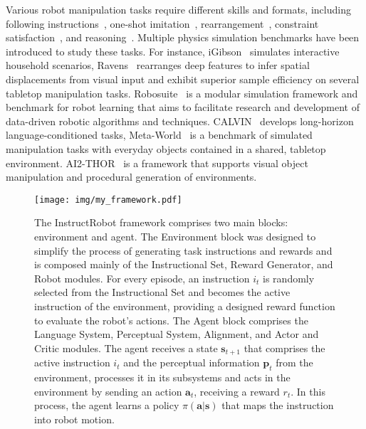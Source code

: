 Various robot manipulation tasks require different skills and formats, including following instructions~\cite{stepputtis2020language}, one-shot imitation~\cite{finn2017one}, rearrangement~\cite{batra2020rearrangement}, constraint satisfaction~\cite{brunke2022safe}, and reasoning~\cite{shridhar2020alfred}. Multiple physics simulation benchmarks have been introduced to study these tasks. For instance, iGibson~\cite{shen2021igibson, li2021igibson, srivastava2022behavior, li2023behavior} simulates interactive household scenarios, Ravens~\cite{zeng2021transporter} rearranges deep features to infer spatial displacements from visual input and exhibit superior sample efficiency on several tabletop manipulation tasks. Robosuite~\cite{zhu2020robosuite} is a modular simulation framework and benchmark for robot learning that aims to facilitate research and development of data-driven robotic algorithms and techniques. CALVIN~\cite{mees2022calvin} develops long-horizon language-conditioned tasks, Meta-World~\cite{yu2020meta} is a benchmark of simulated manipulation tasks with everyday objects contained in a shared, tabletop environment. AI2-THOR~\cite{ehsani2021manipulathor} is a framework that supports visual object manipulation and procedural generation of environments.

\begin{figure*}[b!]
\centering
    \texttt{[image: img/my\_framework.pdf]}\hfill
    \caption{The InstructRobot framework comprises two main blocks: environment and agent. The Environment block was designed to simplify the process of generating task instructions and rewards and is composed mainly of the Instructional Set, Reward Generator, and Robot modules. For every episode, an instruction $i_t$ is randomly selected from the Instructional Set and becomes the active instruction of the environment, providing a designed reward function to evaluate the robot's actions. The Agent block comprises the Language System, Perceptual System, Alignment, and Actor and Critic modules. The agent receives a state $\textbf{s}_{t+1}$ that comprises the active instruction $i_t$ and the perceptual information $\textbf{p}_t$ from the environment, processes it in its subsystems and acts in the environment by sending an action $\textbf{a}_t$, receiving a reward $r_t$. In this process, the agent learns a policy $\pi(\textbf{a}|\textbf{s})$ that maps the instruction into robot motion.}
    \label{fig:all_framework}
\end{figure*}

